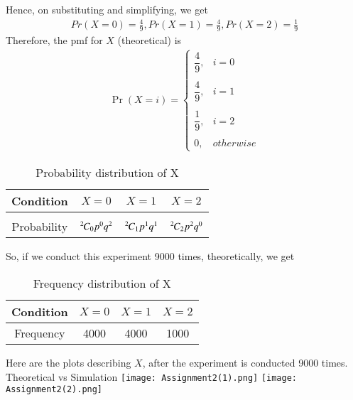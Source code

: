 \documentclass[journal,12pt,twocolumn]{IEEEtran}
\begin{document}
Hence, on substituting and simplifying, we get
\begin{align}
    \tag{5.25.10}
    Pr(X=0)=\frac{4}{9},Pr(X=1)=\frac{4}{9},Pr(X=2)=\frac{1}{9}
\end{align}
Therefore, the pmf for $X$ (theoretical) is
\begin{align}
    \tag{5.25.11}
    \Pr(X=i) = 
	\begin{cases}
	\dfrac{4}{9}, & i=0 \\~\\[-1em]
	\dfrac{4}{9}, & i=1 \\~\\[-1em]
	\dfrac{1}{9}, & i=2 \\~\\[-1em]
	0, & otherwise
	\end{cases}
\end{align}
\begin{table}[h!]
\centering
\caption{Probability distribution of X}
\label{table:1}
\begin{tabular}{|c||c|c|c|}
    \hline
    Condition & $X = 0$& $X =1 $& $X=2$ \\
    \hline
    & & &\\
    Probability & ${{}^{2}\mkern-1muC_{0}}p^{0}q^{2}$ & ${{}^{2}\mkern-1muC_{1}}p^{1}q^{1}$ & ${{}^{2}\mkern-1muC_{2}}p^{2}q^{0}$\\[1ex]
    \hline
\end{tabular}
\end{table}
\begin{comment}
\begin{center}
\caption{Probability distribution of X}
\label{table:1}
\begin{tabular}{|c||c|c|c|}
    \hline
    Condition & $X = 0$& $X =1 $& $X=2$ \\
    \hline
    & & &\\
    Probability & $\comb{2}{0}p^{0}q^{2}$ & $\comb{2}{1}p^{1}q^{1}$ & $\comb{2}{2}p^{2}q^{0}$\\[1ex]
    \hline
\end{tabular}
\end{center}
\end{comment}
\newpage
So, if we conduct this experiment 9000 times, theoretically, we get 
\begin{table}[h!]
\centering
\caption{Frequency distribution of X}
\label{table:2}
\begin{tabular}{|c||c|c|c|}
    \hline
    Condition & $X = 0$& $X =1 $& $X=2$ \\
    \hline
    Frequency & 4000 & 4000 & 1000\\
    \hline
\end{tabular}
\end{table}
\newline
Here are the plots describing $X$, after the experiment is conducted 9000 times.
\newline
\newline
Theoretical vs Simulation
\newline
\newline
\texttt{[image: Assignment2(1).png]}
\texttt{[image: Assignment2(2).png]}
\end{document}
